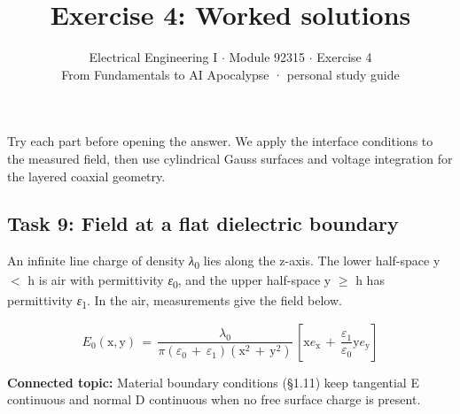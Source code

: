 \documentclass[11pt]{article}
\title{\sffamily\bfseries\color{FAUblue}Exercise 4: Worked solutions}
\author{Electrical Engineering I \ensuremath{\cdot} Module 92315 \ensuremath{\cdot} Exercise 4\\[2pt]\small From Fundamentals to AI Apocalypse · personal study guide}
\date{}
\begin{document}
\maketitle
\begingroup\footnotesize\setlength{\parskip}{0pt}\tableofcontents\endgroup
\clearpage

{\large Try each part before opening the answer. We apply the interface conditions to the measured field, then use cylindrical Gauss surfaces and voltage integration for the layered coaxial geometry.}


\begin{keepsection}
\section{Task 9: Field at a flat dielectric boundary}

An infinite line charge of density \textit{λ}\textsubscript{0} lies along the z-axis. The lower half-space y \ensuremath{<} h is air with permittivity \textit{ε}\textsubscript{0}, and the upper half-space y \ensuremath{\geq} h has permittivity \textit{ε}\textsubscript{1}. In the air, measurements give the field below.

\begin{equation*}{E}_{0}(\mathrm{x},\mathrm{y})\, =\, \dfrac{{λ}_{0}}{π({ε}_{0}\, +\, {ε}_{1})(\mathrm{x}^{2}\, +\, \mathrm{y}^{2})}\, \left[\mathrm{x}{e}_{\mathrm{x}}\, +\, \dfrac{{ε}_{1}}{{ε}_{0}}\mathrm{y}{e}_{\mathrm{y}}\right]\end{equation*}

\textbf{Connected topic:} Material boundary conditions (§1.11) keep tangential E continuous and normal D continuous when no free surface charge is present.


\end{keepsection}
\end{document}
